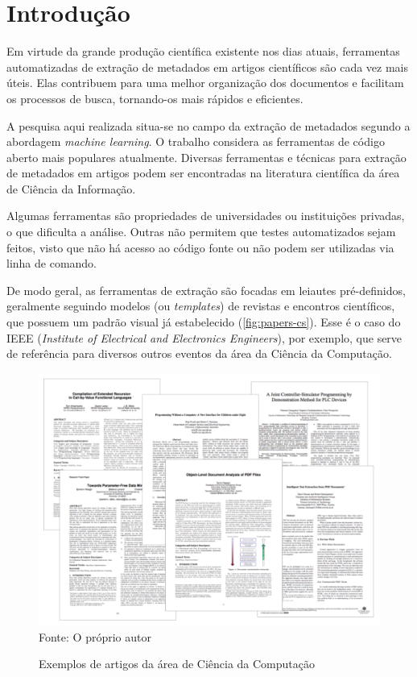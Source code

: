 
\chapter{Introdução}
\label{cha:introduction}

Em virtude da grande produção científica existente nos dias atuais, ferramentas automatizadas de extração de metadados em artigos científicos são cada vez mais úteis. Elas contribuem para uma melhor organização dos documentos e facilitam os processos de busca, tornando-os mais rápidos e eficientes.

A pesquisa aqui realizada situa-se no campo da extração de metadados segundo a abordagem \textit{machine learning}. O trabalho considera as ferramentas de código aberto mais populares atualmente. Diversas ferramentas e técnicas para extração de metadados em artigos podem ser encontradas na literatura científica da área de Ciência da Informação. 

Algumas ferramentas são propriedades de universidades ou instituições privadas, o que dificulta a análise. Outras não permitem que testes automatizados sejam feitos, visto que não há acesso ao código fonte ou não podem ser utilizadas via linha de comando.

De modo geral, as ferramentas de extração são focadas em leiautes pré-definidos, geralmente seguindo modelos (ou \textit{templates}) de revistas e encontros científicos, que possuem um padrão visual já estabelecido (\autoref{fig:papers-cs}). Esse é o caso do IEEE (\textit{Institute of Electrical and Electronics Engineers}), por exemplo, que serve de referência para diversos outros eventos da área da Ciência da Computação.

\begin{figure}[h!]
    \centering
    \caption{Exemplos de artigos da área de Ciência da Computação}
    \label{fig:papers-cs}
    \includegraphics[width=0.7\linewidth]{./assets/images/papers-cs}
    \center\footnotesize{Fonte: O próprio autor}
\end{figure}


